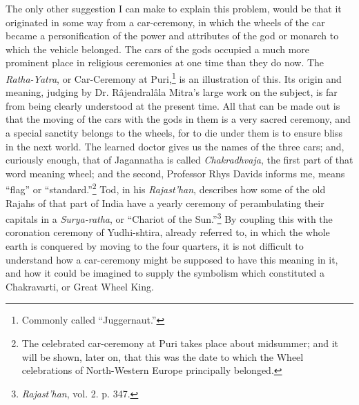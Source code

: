 \documentclass[a4paper, 11pt, oneside, polutonikogreek, english]{article}
\begin{document}
The only other suggestion I can make to explain this problem, would be that it originated in some way from a car-ceremony, in which the wheels of the car became a personification of the power and attributes of the god or monarch to which the vehicle belonged. The cars of the gods occupied a much more prominent place in religious ceremonies at one time than they do now. The \emph{Ratha-Yatra}, or Car-Ceremony at Puri,\footnote{Commonly called ``Juggernaut.''} is an illustration of this. Its origin and meaning, judging by Dr. Râjendralâla Mitra's large work on the subject, is far from being clearly understood at the present time. All that can be made out is that the moving of the cars with the gods in them is a very sacred ceremony, and a special sanctity belongs to the wheels, for to die under them is to ensure bliss in the next world. The learned doctor gives us the names of the three cars; and, curiously enough, that of Jagannatha is called \emph{Chakradhvaja}, the first part of that word meaning wheel; and the second, Professor Rhys Davids informs me, means ``flag'' or ``standard.''\footnote{The celebrated car-ceremony at Puri takes place about midsummer; and it will be shown, later on, that this was the date to which the Wheel celebrations of North-Western Europe principally belonged.} Tod, in his \emph{Rajast'han}, describes how some of the old Rajahs of that part of India have a yearly ceremony of perambulating their capitals in a \emph{Surya-ratha}, or ``Chariot of the Sun.''\footnote{\emph{Rajast'han}, vol. 2. p. 347.} By coupling this with the coronation ceremony of Yudhi-shtira, already referred to, in which the whole earth is conquered by moving to the four quarters, it is not difficult to understand how a car-ceremony might be supposed to have this meaning in it, and how it could be imagined to supply the symbolism which constituted a Chakravarti, or Great Wheel King.
\end{document}
